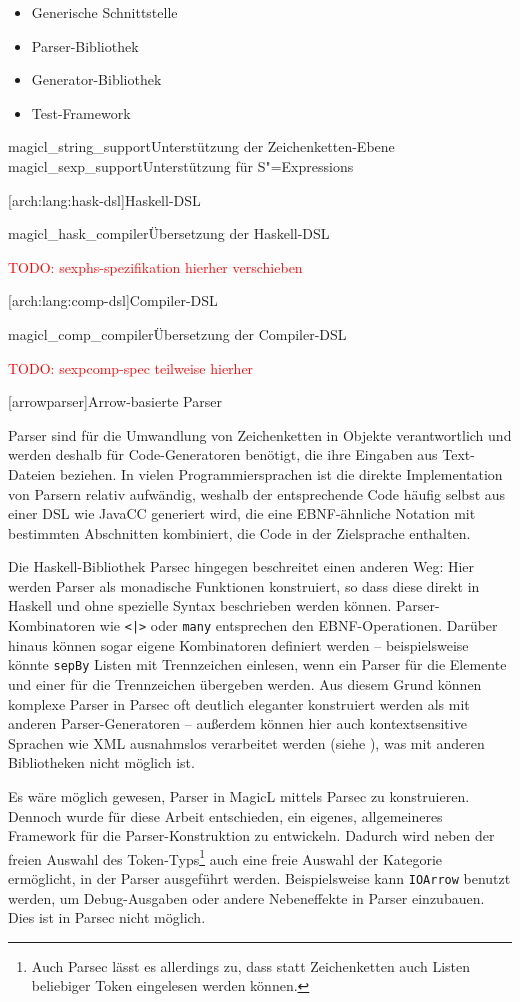 \documentclass[11pt, a4paper, bibgerm]{scrbook}
\newcommand\icode[1]{\lstinline?#1?}
\newcommand{\todo}[1]{
  \textcolor{red}{TODO: #1}
}
\newcommand\lchapter{}
\newcommand\lsubsection{}
\newcommand\fig{}
\newcommand{\sexps}{S"=Expressions}
\begin{document}
\begin{itemize}
\item Generische Schnittstelle
\item Parser-Bibliothek
\item Generator-Bibliothek
\item Test-Framework
\end{itemize}

\fig{magicl_string_support}{Unterstützung der Zeichenketten-Ebene}
\fig{magicl_sexp_support}{Unterstützung für \sexps{}}


\lsubsection[arch:lang:hask-dsl]{Haskell-DSL}

\fig{magicl_hask_compiler}{Übersetzung der Haskell-DSL}
\todo{sexphs-spezifikation hierher verschieben}

\lsubsection[arch:lang:comp-dsl]{Compiler-DSL}

\fig{magicl_comp_compiler}{Übersetzung der Compiler-DSL}

\todo{sexpcomp-spec teilweise hierher}


\lchapter[arrowparser]{Arrow-basierte Parser}

Parser sind für die Umwandlung von Zeichenketten in Objekte
verantwortlich und werden deshalb für Code-Generatoren benötigt, die
ihre Eingaben aus Text-Dateien beziehen. In vielen Programmiersprachen
ist die direkte Implementation von Parsern relativ aufwändig, weshalb
der entsprechende Code häufig selbst aus einer DSL wie JavaCC
generiert wird, die eine EBNF-ähnliche Notation mit bestimmten
Abschnitten kombiniert, die Code in der Zielsprache enthalten.

Die Haskell-Bibliothek Parsec \cite{Parsec} hingegen beschreitet einen
anderen Weg: Hier werden Parser als monadische Funktionen konstruiert,
so dass diese direkt in Haskell und ohne spezielle Syntax beschrieben
werden können. Parser-Kombinatoren wie \icode{<|>} oder \icode{many}
entsprechen den EBNF-Operationen. Darüber hinaus können sogar eigene
Kombinatoren definiert werden -- beispielsweise könnte \icode{sepBy}
Listen mit Trennzeichen einlesen, wenn ein Parser für die Elemente und
einer für die Trennzeichen übergeben werden. Aus diesem Grund können
komplexe Parser in Parsec oft deutlich eleganter konstruiert werden als
mit anderen Parser-Generatoren -- außerdem können hier auch
kontextsensitive Sprachen wie XML ausnahmslos verarbeitet werden (siehe
\cite[S. 3]{Parsec}), was mit anderen Bibliotheken nicht möglich ist.

Es wäre möglich gewesen, Parser in MagicL mittels Parsec zu
konstruieren. Dennoch wurde für diese Arbeit entschieden, ein eigenes,
allgemeineres Framework für die Parser-Konstruktion zu
entwickeln. Dadurch wird neben der freien Auswahl des
Token-Typs\footnote{Auch Parsec lässt es allerdings zu, dass statt
  Zeichenketten auch Listen beliebiger Token eingelesen werden können.}
auch eine freie Auswahl der Kategorie ermöglicht, in der Parser
ausgeführt werden. Beispielsweise kann \icode{IOArrow} benutzt werden,
um Debug-Ausgaben oder andere Nebeneffekte in Parser einzubauen. Dies
ist in Parsec nicht möglich.
\end{document}
